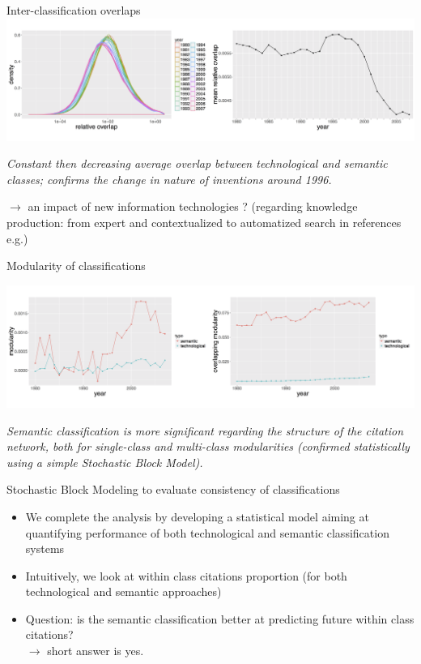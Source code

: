 \documentclass{beamer}
\begin{document}
\begin{frame}{Inter-classification overlaps}
   \centering
    \includegraphics[width=\textwidth]{figures/Fig8.png}
    
    \medskip

    \textit{Constant then decreasing average overlap between technological and semantic classes; confirms the change in nature of inventions around 1996.} 
    
    \smallskip
    
    $\rightarrow$ an impact of new information technologies ? (regarding knowledge production: from expert and contextualized to automatized search in references e.g.) 
    
\end{frame}

\begin{frame}{Modularity of classifications} \label{slide:modularity}
\hyperlink{slide:modularity_def}{}

   \centering
    \includegraphics[width=\textwidth]{figures/Fig9.png}
    
    \medskip
    
    \textit{Semantic classification is more significant regarding the structure of the citation network, both for single-class and multi-class modularities (confirmed statistically using a simple Stochastic Block Model).}
    
\end{frame}

\begin{frame}{Stochastic Block Modeling to evaluate consistency of classifications}
\begin{itemize}
    \item   We complete the analysis by developing a statistical model aiming at quantifying performance of both technological and semantic classification systems
    \item Intuitively, we look at within class citations proportion (for both technological and semantic approaches)
    \item Question: is the semantic classification better at predicting future within class citations? \\
    $\longrightarrow$ short answer is \alert{yes}.
\end{itemize} 
\end{frame}
\end{document}

